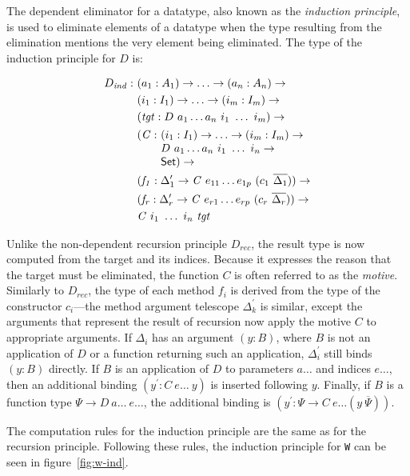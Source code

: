 \documentclass[runningheads]{llncs}
\begin{document}
The dependent eliminator for a datatype, also known as the \emph{induction principle}, is used to eliminate elements of a datatype when the type resulting from the elimination mentions the very element being eliminated. The type of the induction principle for $D$ is:
\begin{center}
\fontsize{7.9pt}{2pt}\selectfont
\begin{align*}
D_{\mathit{ind}} :\ & (a_1 : A_1) \to \ldots \to (a_n : A_n) \to\\
& (i_1 : I_1) \to \ldots \to (i_m : I_m) \to\\
& (\mathit{tgt} : D\ a_1 \ldots a_n\ i_1\ \ldots\ i_m) \to\\
& \begin{array}{@{}l@{}l}(\mathit{C} :\ & (i_1 : I_1) \to \ldots \to (i_m : I_m) \to\\  & D\ a_1 \ldots a_n\ i_1\ \ldots\ i_n \to\\ &\SET{})\to\end{array} \\
& (\mathit{f_1} : \Delta_1^\prime \to \mathit{C}\ e_{11} \ldots e_{1p}\ (c_1\ \overline{\Delta_1})) \to \\
& (\mathit{f_r} : \Delta_r^\prime \to \mathit{C}\ e_{r1} \ldots e_{rp}\ (c_r\ \overline{\Delta_r})) \to \\
& \mathit{C}\ i_1\ \ldots\ i_n\ \mathit{tgt}
\end{align*}
\end{center}
Unlike the non-dependent recursion principle $D_{\mathit{rec}}$, the result type is now computed from the target and its indices.
Because it expresses the reason that the target must be eliminated, the function $C$ is often referred to as the \emph{motive}.
Similarly to  $D_{\mathit{rec}}$, the type of each method $f_i$ is derived from the type of the constructor $c_i$---the method argument telescope $\Delta_k^\prime$ is similar, except the arguments that represent the result of recursion now apply the motive $C$ to appropriate arguments.
If $\Delta_i$ has an argument $(y : B)$, where $B$ is not an application of $D$ or a function returning such an application, $\Delta_i^\prime$ still binds $(y : B)$ directly.
If $B$ is an application of $D$ to parameters $a\ldots$ and indices $e\ldots$, then an additional binding $(y^\prime : C\ e\ldots\ y)$ is inserted following $y$.
Finally, if $B$ is a function type $\Psi \to D\ a\ldots\ e\ldots$, the additional binding is $(y^\prime : \Psi \to C\ e\ldots (y\ \overline{\Psi}))$. 

The computation rules for the induction principle are the same as for the recursion principle.
Following these rules, the induction principle for \texttt{W} can be seen in figure~\ref{fig:w-ind}.
\end{document}
